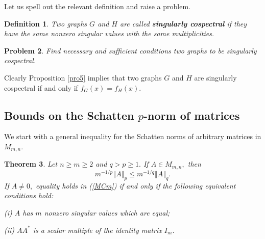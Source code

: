 \documentclass[12pt]{article}%
\newtheorem{theorem}{Theorem}[section]
\newtheorem{definition}[theorem]{Definition}
\newtheorem{problem}[theorem]{Problem}
\begin{document}
Let us spell out the relevant definition and raise a problem.

\begin{definition}
Two graphs $G$ and $H$ are called \textbf{singularly cospectral} if they have
the same nonzero singular values with the same multiplicities.
\end{definition}

\begin{problem}
Find necessary and sufficient conditions two graphs to be singularly cospectral.
\end{problem}

Clearly Proposition \ref{pro5} implies that two graphs $G$ and $H$ are
singularly cospectral if and only if $f_{G}\left(  x\right)  =f_{H}\left(
x\right)  .$

\subsection{\label{SSm}Bounds on the Schatten $p$-norm of matrices}

We start with a general inequality for the Schatten norms of arbitrary
matrices in $M_{m,n}$.

\begin{theorem}
\label{MCgen}Let $n\geq m\geq2$ and $q>p\geq1.$ If $A\in M_{m,n},$ then
\begin{equation}
m^{-1/p}\left\Vert A\right\Vert _{p}\leq m^{-1/q}\left\Vert A\right\Vert _{q}.
\label{MCm}%
\end{equation}
If $A\neq0,$ equality holds in (\ref{MCm}) if and only if the following
equivalent conditions hold:

(i) $A$ has $m$ nonzero singular values which are equal;

(ii) $AA^{\ast}$ is a scalar multiple of the identity matrix $I_{m}$.
\end{theorem}
\end{document}
